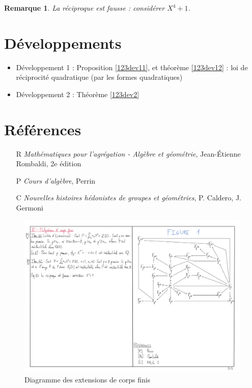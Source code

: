 \documentclass[10pt, a4paper, parskip=full, twoside, twocolumn]{report}
\newtheorem{remark}[definition]{Remarque}
\begin{document}
\begin{remark}
	La réciproque est fausse : considérer $X^4 + 1$.
\end{remark}

\section*{Développements}
\begin{itemize}
	\item Développement 1 : Proposition \ref{123dev11}, et théorème \ref{123dev12} : loi de réciprocité quadratique (par les formes quadratiques)
	\item Développement 2 : Théorème \ref{123dev2}
\end{itemize}

\section*{Références}
\begin{itemize}
	\item[R] \emph{Mathématiques pour l'agrégation - Algèbre et géométrie}, Jean-Étienne Rombaldi, 2e édition
	\item[P] \emph{Cours d'algèbre}, Perrin
	\item[C] \emph{Nouvelles histoires hédonistes de groupes et géométries}, P. Caldero, J. Germoni
\end{itemize}

\begin{figure}[!htb]
	\centering
	\includegraphics[trim={0 0 0 0},clip,width=1\linewidth]{img/diagramme_extensions_corps_finis.pdf}
	\caption{Diagramme des extensions de corps finis}
\end{figure}
\end{document}
